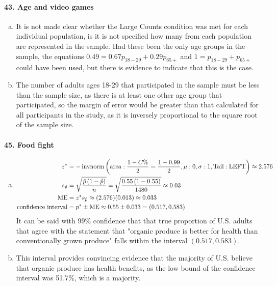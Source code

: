 		\paragraph{43. Age and video games}
			\begin{enumerate}[a.]
				\item
					It is not made clear whether the Large Counts condition was met for each individual population, is it is not specified how many from each population are represented in the sample. Had these been the only age groups in the sample, the equations $0.49 = 0.67p_{18-29} + 0.29p_{65+}$ and $ 1 = p_{18-29} + p_{65+}$ could have been used, but there is evidence to indicate that this is the case.
				\item
					The number of adults ages 18-29 that participated in the sample must be less than the sample size, as there is at least one other age group that participated, so the margin of error would be greater than that calculated for all participants in the study, as it is inversely proportional to the square root of the sample size.
			\end{enumerate}
		\paragraph{45. Food fight}
			\begin{enumerate}[a.]
				\item
					\begin{align*}
						z^* &= -\operatorname{invnorm}\left(\operatorname{area}:\frac{1 - C\%}{2} = \frac{1 - 0.99}{2}, \mu: 0, \sigma: 1, \mathrm{Tail: LEFT}\right) \approx 2.576 \\
						s_{\hat{p}} &= \sqrt{\frac{\hat{p}\left(1 - \hat{p}\right)}{n}} = \sqrt{\frac{0.55\left(1 - 0.55\right)}{1480}} \approx 0.03 \\
						\operatorname{ME} &= z^*s_{\hat{p}} \approx (2.576)(0.013) \approx 0.033 \\
						\text{confidence interval} &= p^* \pm \operatorname{ME} \approx 0.55 \pm 0.033 = (0.517, 0.583) \\ 
					\end{align*}
					It can be said with 99\% confidence that that true proportion of U.S. adults that agree with the statement that "organic produce is better for health than conventionally grown produce" falls within the interval $(0.517, 0.583)$.
				\item
					This interval provides convincing evidence that the majority of U.S. believe that organic produce has health benefits, as the low bound of the confidence interval was 51.7\%, which is a majority.
			\end{enumerate}
